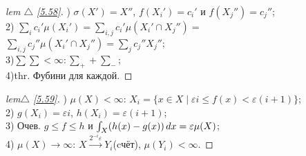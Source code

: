 
\begin{minipage}[]{0.45\textwidth}
\begin{proof}[
lem $\triangle$
\eqref{5.58}]

\phantom{42}

) $\sigma(X')= X''$, $f(X_i') = c_i'$ и $f(X_j'') = c_j''$;\\
2) $\sum\nolimits_{ i }^{  } c_i'\mu(X_i') = \sum\nolimits_{ i,j }^{  } c_i'\mu(X_i'\cap X_j'') =$\\$\sum\nolimits_{ i,j }^{} c_j''\mu(X_i'\cap X_j'') = \sum\nolimits_{ j }^{  } c_j'' X_j''$;\\
3)$\sum \sum < \infty: \sum_+ + \sum_-$;\\
4)thr. Фубини для каждой.
\end{proof}
\end{minipage}
\hfill
\begin{minipage}[]{0.55\textwidth}
\begin{proof}[
 lem$ \triangle$
\eqref{5.59}]

\phantom{42}

) $\mu(X)< \infty$: $X_i = \{ x \in X \mid \varepsilon i \leq f(x) < \varepsilon (i+1) \}$;\\
2) $g(X_i) = \varepsilon i$, $h(X_i) = \varepsilon (i+1)$;\\
3) Очев. $g \leq f \leq h$ и $\int_X (h(x) - g(x))\, d x = \varepsilon \mu(X)$;\\
4) $\mu(X) \to \infty$: $X\overset{2^{-i}\varepsilon}{\to} Y_i$(cчёт), $\mu(Y_i)< \infty$. 

\end{proof}
\end{minipage}

